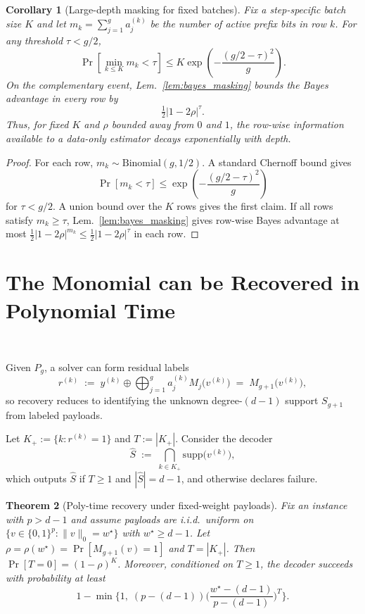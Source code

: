 \documentclass{article}
\newtheorem{theorem}{Theorem}[section]
\newtheorem{corollary}[theorem]{Corollary}
\begin{document}
\begin{corollary}[Large-depth masking for fixed batches]\label{cor:batch_masking}
Fix a step-specific batch size $K$ and let $m_k=\sum_{j=1}^g a_j^{(k)}$ be the number of active prefix bits in row $k$.
For any threshold $\tau<g/2$,
\[
\Pr\!\left[\min_{k\le K} m_k < \tau\right]
\le
K\exp\!\left(-\frac{(g/2-\tau)^2}{g}\right).
\]
On the complementary event, Lem.~\ref{lem:bayes_masking} bounds the Bayes advantage in every row by
\[
\tfrac{1}{2}|1-2\rho|^{\tau}.
\]
Thus, for fixed $K$ and $\rho$ bounded away from $0$ and $1$, the row-wise information available to a data-only estimator decays exponentially with depth.
\end{corollary}

\begin{proof}
For each row, $m_k\sim\mathrm{Binomial}(g,1/2)$. A standard Chernoff bound gives
\[
\Pr[m_k<\tau]\le \exp\!\left(-\frac{(g/2-\tau)^2}{g}\right)
\]
for $\tau<g/2$. A union bound over the $K$ rows gives the first claim. If all rows satisfy $m_k\ge \tau$, Lem.~\ref{lem:bayes_masking} gives row-wise Bayes advantage at most $\tfrac{1}{2}|1-2\rho|^{m_k}\le \tfrac{1}{2}|1-2\rho|^\tau$ in each row.
\end{proof}

\section{The Monomial can be Recovered in Polynomial Time}~\label{appendix:poly-time-recovery}

Given $P_g$, a solver can form residual labels
\begin{equation}\label{eq:residual}
r^{(k)}
\;:=\;
y^{(k)} \oplus \bigoplus_{j=1}^{g} a^{(k)}_j M_j\!\big(v^{(k)}\big)
\;=\;
M_{g+1}\!\big(v^{(k)}\big),
\end{equation}
so recovery reduces to identifying the unknown degree-$(d-1)$ support $S_{g+1}$ from labeled payloads.

Let $K_+ := \{k: r^{(k)}=1\}$ and $T:=|K_+|$. Consider the decoder
\begin{equation}\label{eq:intersection_decoder}
\widehat S \;:=\; \bigcap_{k\in K_+} \mathrm{supp}\!\big(v^{(k)}\big),
\end{equation}
which outputs $\widehat S$ if $T\ge 1$ and $|\widehat S|=d-1$, and otherwise declares failure.

\begin{theorem}[Poly-time recovery under fixed-weight payloads]\label{thm:recoverability_poly}
Fix an instance with $p>d-1$ and assume payloads are i.i.d.\ uniform on $\{v\in\{0,1\}^p:\|v\|_0=w^\star\}$ with $w^\star\ge d-1$.
Let $\rho=\rho(w^\star)=\Pr[M_{g+1}(v)=1]$ and $T=|K_+|$. Then $\Pr[T=0]=(1-\rho)^K$.
Moreover, conditioned on $T\ge 1$, the decoder succeeds with probability at least
\begin{equation}\label{eq:recover_bound_T}
1 - \min\Big\{1,\; (p-(d-1))\Big(\frac{w^\star-(d-1)}{p-(d-1)}\Big)^T\Big\}.
\end{equation}
\end{theorem}
\end{document}
